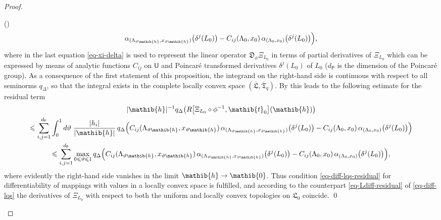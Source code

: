 \documentclass[11pt,twoside,openright]{report}
\theoremstyle{definition}
\theoremstyle{plain}
\theoremstyle{remark}
\theoremstyle{assumption}
\newcommand{\abs}[1]{\lvert #1 \rvert}
\newcommand{\qD}{q_\Delta}
\newcommand{\bqDx}[1]{q_\Delta \bigl( #1 \bigr)}
\newcommand{\BqDx}[1]{q_\Delta \Bigl( #1 \Bigr)}
\newcommand{\Dfrak}{\mathfrak{D}}
\newcommand{\Lfrak}{\mathfrak{L}}
\newcommand{\zeroib}{\mathib{0}}
\newcommand{\hib}{\mathib{h}}
\newcommand{\tib}{\mathib{t}}
\newcommand{\Psf}{\mathsf{P}}
\newcommand{\Usf}{\mathsf{U}}
\newcommand{\Lfrakbar}{\overline{\mathfrak{L}}}
\newcommand{\Tfrakbar}{\overline{\mathfrak{T}}}
\newcounter{proofitem}
\newenvironment{prooflist}{\begin{list}{(\roman{proofitem})}%
  {\usecounter{proofitem} \setlength{\topsep}{0ex}%
   \setlength{\parsep}{0.2ex} \setlength{\itemsep}{0.4ex}%
   \setlength{\leftmargin}{0em} \setlength{\itemindent}{0.5em}%
   \setlength{\listparindent}{1em}}}{\qed \end{list}}
\begin{document}
\begin{proof}
\begin{prooflist}
\begin{multline*}
      \alpha_{( \Lambda_{\vartheta \hib} , x_{\vartheta \hib} )}
      \bigl( \delta^j ( L_0 ) \bigr) - C_{i j} ( \Lambda_0 , x_0 ) \,
      \alpha_{( \Lambda_0 , x_0 )} \bigl( \delta^j ( L_0 ) \bigr)
      \Bigr) \text{,}
    \end{multline*}
    where in the last equation \eqref{eq-xi-delta} is used to
    represent the linear operator $\Dfrak_\phi \Xi_{L_0}$ in terms of
    partial derivatives of $\Xi_{L_0}$ which can be expressed by means
    of analytic functions $C_{i j}$ on $\Usf$ and Poincar\'{e}
    transformed derivatives $\delta^j ( L_0 )$ of $L_0$ ($d_\Psf$ is
    the dimension of the Poincar\'{e} group). As a consequence of the
    first statement of this proposition, the integrand on the
    right-hand side is continuous with respect to all seminorms $\qD$,
    so that the integral exists in the complete locally convex space
    $( \Lfrakbar , \Tfrakbar_q )$. By \cite[II.6.2 and
    5.4]{fell/doran:1988a} this leads to the following estimate for
    the residual term
    \begin{multline*}
      \abs{\hib}^{-1} \bqDx{R \bigl[ \Xi_{L_0} \circ \phi^{-1} ,
      \tib_0 \bigr] ( \hib )} \\
      \leqslant \sum_{i , j = 1}^{d_\Psf} \int_0^1 d \vartheta \;
      \frac{\abs{h_i}}{\abs{\hib}} \, \BqDx{C_{i j} (
      \Lambda_{\vartheta \hib} , x_{\vartheta \hib} ) \, \alpha_{(
      \Lambda_{\vartheta \hib} , x_{\vartheta \hib} )} \bigl( \delta^j
      ( L_0 ) \bigr) - C_{i j} ( \Lambda_0 , x_0 ) \, \alpha_{(
      \Lambda_0 , x_0 )} \bigl( \delta^j ( L_0 ) \bigr)} \\
      \leqslant \sum_{i , j = 1}^{d_\Psf} \max_{0 \leqslant \vartheta
      \leqslant 1} \BqDx{C_{i j} ( \Lambda_{\vartheta \hib} ,
      x_{\vartheta \hib} ) \, \alpha_{( \Lambda_{\vartheta \hib} ,
      x_{\vartheta \hib} )} \bigl( \delta^j ( L_0 ) \bigr) - C_{i j} (
      \Lambda_0 , x_0 ) \, \alpha_{( \Lambda_0 , x_0 )} \bigl(
      \delta^j ( L_0 ) \bigr)} \text{,}
    \end{multline*}
    where evidently the right-hand side vanishes in the limit $\hib
    \rightarrow \zeroib$. Thus condition \eqref{eq-diff-lqs-residual}
    for differentiability of mappings with values in a locally convex
    space is fulfilled, and according to the counterpart
    \eqref{eq-Ldiff-residual} of \eqref{eq-diff-lqs} the derivatives
    of $\Xi_{L_0}$ with respect to both the uniform and locally convex
    topologies on $\Lfrak_0$ coincide.
  \end{prooflist}
  \renewcommand{\qed}{}
\end{proof}
\end{document}
